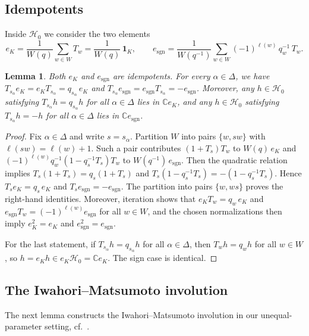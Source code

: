 \documentclass[12pt]{article}
\numberwithin{equation}{section}
\newtheorem{lemma}[theorem]{Lemma}
\theoremstyle{definition}
\theoremstyle{remark}
\theoremstyle{plain}
\begin{document}
\subsection{Idempotents}\label{subsec:idempotents}
Inside $\mathcal{H}_0$ we consider the two elements
$$e_K = \frac{1}{W(q)}\sum_{w\in W} T_w = \frac{1}{W(q)}\,\mathbf{1}_K, \qquad e_{\mathrm{sgn}} = \frac{1}{W(q^{-1})}\sum_{w\in W} (-1)^{\ell(w)}\,q_w^{-1}\, T_w.$$

\begin{lemma}\label{lem:idempotents}
Both $e_K$ and $e_{\mathrm{sgn}}$ are idempotents. For every $\alpha \in \Delta$, we have $T_{s_\alpha} e_K = e_K T_{s_\alpha} = q_{s_\alpha}\, e_K$ and $T_{s_\alpha} e_{\mathrm{sgn}} = e_{\mathrm{sgn}} T_{s_\alpha} = -e_{\mathrm{sgn}}$. Moreover, any $h \in \mathcal{H}_0$ satisfying $T_{s_\alpha} h = q_{s_\alpha}h$ for all $\alpha \in \Delta$ lies in $\mathbb{C}e_K$, and any $h \in \mathcal{H}_0$ satisfying $T_{s_\alpha} h = -h$ for all $\alpha \in \Delta$ lies in $\mathbb{C}e_{\mathrm{sgn}}$.
\end{lemma}
\begin{proof}
Fix $\alpha \in \Delta$ and write $s = s_\alpha$. Partition $W$ into pairs $\{w, sw\}$ with $\ell(sw) = \ell(w)+1$. Such a pair contributes $(1+T_s)T_w$ to $W(q)\,e_K$ and $(-1)^{\ell(w)}q_w^{-1}(1 - q_s^{-1}T_s)T_w$ to $W(q^{-1})\,e_{\mathrm{sgn}}$. Then the quadratic relation implies $T_s(1+T_s) = q_s(1+T_s)$ and $T_s(1 - q_s^{-1}T_s) = -(1 - q_s^{-1}T_s)$. Hence $T_s e_K = q_s\,e_K$ and $T_s e_{\mathrm{sgn}} = -e_{\mathrm{sgn}}$. The partition into pairs $\{w, ws\}$ proves the right-hand identities. Moreover, iteration shows that $e_K T_w = q_w\, e_K$ and $e_{\mathrm{sgn}} T_w = (-1)^{\ell(w)} e_{\mathrm{sgn}}$ for all $w \in W$, and the chosen normalizations then imply $e_K^2 = e_K$ and $e_{\mathrm{sgn}}^2 = e_{\mathrm{sgn}}$.

For the last statement, if $T_{s_\alpha}h = q_{s_\alpha}h$ for all $\alpha\in\Delta$, then $T_w h = q_wh$ for all $w \in W$, so $h = e_K h \in e_K \mathcal{H}_0 = \mathbb{C}e_K$. The sign case is identical.
\end{proof}

\subsection{The Iwahori--Matsumoto involution}\label{subsec:IM}

The next lemma constructs the Iwahori--Matsumoto involution in our unequal-parameter setting, cf.\ \cite[Section 2.2]{Jan}.
\end{document}
